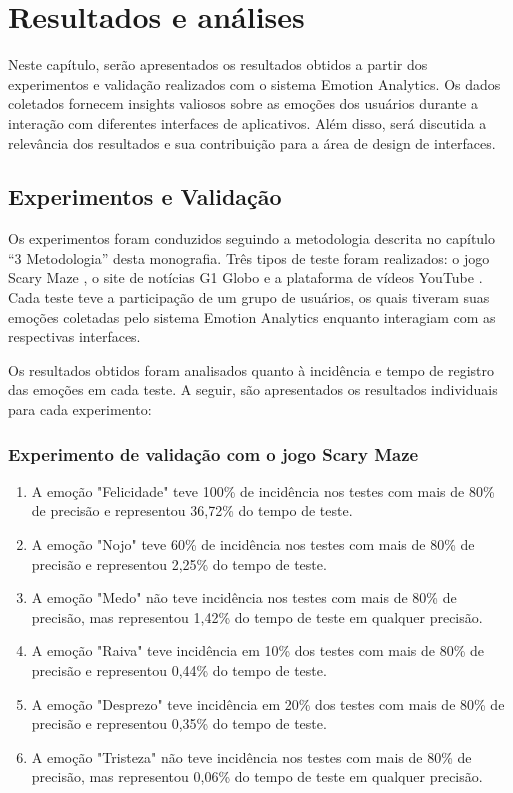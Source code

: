 \chapter{Resultados e análises}

Neste capítulo, serão apresentados os resultados obtidos a partir dos experimentos e validação realizados com o sistema Emotion Analytics. Os dados coletados fornecem insights valiosos sobre as emoções dos usuários durante a interação com diferentes interfaces de aplicativos. Além disso, será discutida a relevância dos resultados e sua contribuição para a área de design de interfaces.

\section{Experimentos e Validação}

Os experimentos foram conduzidos seguindo a metodologia descrita no capítulo “3 Metodologia” desta monografia. Três tipos de teste foram realizados: o jogo Scary Maze \cite{18}, o site de notícias G1 Globo \cite{19} e a plataforma de vídeos YouTube \cite{20}. Cada teste teve a participação de um grupo de usuários, os quais tiveram suas emoções coletadas pelo sistema Emotion Analytics enquanto interagiam com as respectivas interfaces.

Os resultados obtidos foram analisados quanto à incidência e tempo de registro das emoções em cada teste. A seguir, são apresentados os resultados individuais para cada experimento:

\subsection{Experimento de validação com o jogo Scary Maze \cite{18}}

\begin{enumerate}
  \item A emoção "Felicidade" teve 100\% de incidência nos testes com mais de 80\% de precisão e representou 36,72\% do tempo de teste.
  \item A emoção "Nojo" teve 60\% de incidência nos testes com mais de 80\% de precisão e representou 2,25\% do tempo de teste.
  \item A emoção "Medo" não teve incidência nos testes com mais de 80\% de precisão, mas representou 1,42\% do tempo de teste em qualquer precisão.
  \item A emoção "Raiva" teve incidência em 10\% dos testes com mais de 80\% de precisão e representou 0,44\% do tempo de teste.
  \item A emoção "Desprezo" teve incidência em 20\% dos testes com mais de 80\% de precisão e representou 0,35\% do tempo de teste.
  \item A emoção "Tristeza" não teve incidência nos testes com mais de 80\% de precisão, mas representou 0,06\% do tempo de teste em qualquer precisão.
\end{enumerate}

